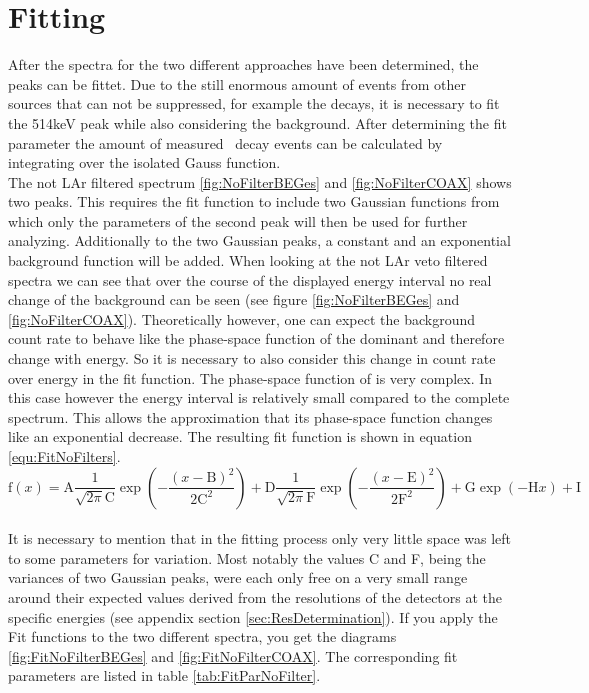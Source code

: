 \documentclass[encoding=utf8,british]{tumphthesis}
\begin{document}
\section{Fitting}
\label{sec:Fitting}

After the spectra for the two different approaches have been determined, the peaks can be fittet.
Due to the still enormous amount of events from other sources that can not be suppressed, for example the  decays, it is necessary to fit the 514keV peak while also considering the background.
After determining the fit parameter the amount of measured \Kr\ decay events can be calculated by integrating over the isolated Gauss function.
\\

The not LAr filtered spectrum \ref{fig:NoFilterBEGes} and \ref{fig:NoFilterCOAX} shows two peaks.
This requires the fit function to include two Gaussian functions from which only the parameters of the second peak will then be used for further analyzing.
Additionally to the two Gaussian peaks, a constant and an exponential background function will be added.
When looking at the not LAr veto filtered spectra we can see that over the course of the displayed energy interval no real change of the background can be seen (see figure \ref{fig:NoFilterBEGes} and \ref{fig:NoFilterCOAX}).
Theoretically however, one can expect the background count rate to behave like the phase-space function of the dominant  and therefore change with energy.
So it is necessary to also consider this change in count rate over energy in the fit function.
The phase-space function of  is very complex.
In this case however the energy interval is relatively small compared to the complete spectrum.
This allows the approximation that its phase-space function changes like an exponential decrease.
The resulting fit function is shown in equation \ref{equ:FitNoFilters}.
\\

\begin{equation}
\mathrm{f}(x) = \mathrm{A}\frac{1}{\sqrt{2\pi}\mathrm{C}}\exp\left(-\frac{(x-\mathrm{B})^2}{2\mathrm{C}^2}\right) + \mathrm{D}\frac{1}{\sqrt{2\pi}\mathrm{F}}\exp\left(-\frac{(x-\mathrm{E})^2}{2\mathrm{F}^2}\right) + \mathrm{G}\exp\left(-\mathrm{H}x\right) + \mathrm{I}
\label{equ:FitNoFilters}
\end{equation}
\\

It is necessary to mention that in the fitting process only very little space was left to some parameters for variation.
Most notably the values C and F, being the variances of two Gaussian peaks, were each only free on a very small range around their expected values derived from the resolutions of the detectors at the specific energies (see appendix section \ref{sec:ResDetermination}).
If you apply the Fit functions to the two different spectra, you get the diagrams \ref{fig:FitNoFilterBEGes} and \ref{fig:FitNoFilterCOAX}.
The corresponding fit parameters are listed in table \ref{tab:FitParNoFilter}. 
\\
\end{document}
